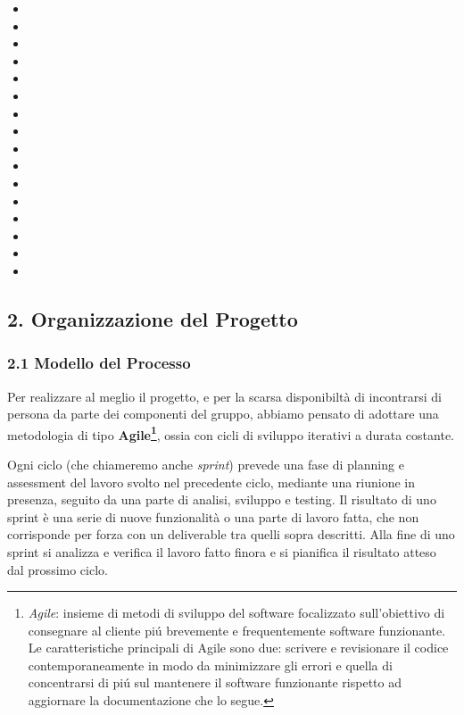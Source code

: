 \documentclass[]{article}
\begin{document}
\begin{itemize}
\item
\item
\item
\item
\item
\item
\item
\item
\item
\item
\item
\item
\item
\item
\item
\item
\end{itemize}

\hypertarget{organizzazione-del-progetto}{%
\subsection{2. Organizzazione del
Progetto}\label{organizzazione-del-progetto}}

\hypertarget{modello-del-processo}{%
\subsubsection{2.1 Modello del Processo}\label{modello-del-processo}}

Per realizzare al meglio il progetto, e per la scarsa disponibiltà di
incontrarsi di persona da parte dei componenti del gruppo, abbiamo
pensato di adottare una metodologia di tipo \textbf{Agile\footnote{\emph{Agile}:
  insieme di metodi di sviluppo del software focalizzato sull'obiettivo
  di consegnare al cliente piú brevemente e frequentemente software
  funzionante. Le caratteristiche principali di Agile sono due: scrivere
  e revisionare il codice contemporaneamente in modo da minimizzare gli
  errori e quella di concentrarsi di piú sul mantenere il software
  funzionante rispetto ad aggiornare la documentazione che lo segue.}},
ossia con cicli di sviluppo iterativi a durata costante.

Ogni ciclo (che chiameremo anche \emph{sprint}) prevede una fase di
planning e assessment del lavoro svolto nel precedente ciclo, mediante
una riunione in presenza, seguito da una parte di analisi, sviluppo e
testing. Il risultato di uno sprint è una serie di nuove funzionalità o
una parte di lavoro fatta, che non corrisponde per forza con un
deliverable tra quelli sopra descritti. Alla fine di uno sprint si
analizza e verifica il lavoro fatto finora e si pianifica il risultato
atteso dal prossimo ciclo.
\end{document}

